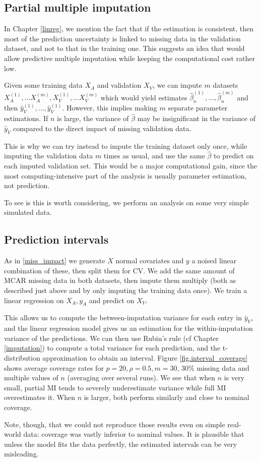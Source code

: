 		\subsection{Partial multiple imputation}
		In Chapter \ref{linreg}, we mention the fact that if the estimation is consistent, then most of the prediction uncertainty is linked to missing data in the validation dataset, and not to that in the training one. This suggests an idea that would allow predictive multiple imputation while keeping the computational cost rather low.
		
		 Given some training data $X_A$ and validation $X_V$, we can impute $m$ datasets $X_A^{(1)}, \ldots X_A^{(m)}, X_V^{(1)}, \ldots X_V^{(m)}$ which would yield estimates $\hat{\beta}_n^{(1)}, \ldots, \hat{\beta}_n^{(m)}$ and then $\hat{y}_V^{(1)}, \ldots, \hat{y}_V^{(1)}$. However, this implies making $m$ separate parameter estimations. If $n$ is large, the variance of $\hat{\beta}$ may be insignificant in the variance of $\hat{y}_V$ compared to the direct impact of missing validation data. 
		 
		 This is why we can try instead to impute the training dataset only once, while imputing the validation data $m$ times as usual, and use the same $\hat{\beta}$ to predict on each imputed validation set. This would be a major computational gain, since the most computing-intensive part of the analysis is usually parameter estimation, not prediction.

To see is this is worth considering, we perform an analysis on some very simple simulated data.

		\subsection{Prediction intervals}
As in \ref{miss_impact} we generate $X$ normal covariates and $y$ a noised linear combination of these, then split them for CV. We add the same amount of MCAR missing data in both datasets, then impute them multiply (both as described just above and by only imputing the training data once). We train a linear regression on $X_A, y_A$ and predict on $X_V$.

This allows us to compute the between-imputation variance for each entry in $\hat{y}_V$, and the linear regression model gives us an estimation for the within-imputation variance of the predictions. We can then use Rubin's rule (cf Chapter \ref{imputation}) to compute a total variance for each prediction, and the t-distribution approximation to obtain an interval. 
Figure \ref{fig.interval_coverage} shows average coverage rates for $p=20, \rho=0.5, m=30$, $30$\% missing data and multiple values of $n$ (averaging over several runs). We see that when $n$ is very small, partial MI tends to severely underestimate variance while full MI overestimates it. When $n$ is larger, both perform similarly and close to nominal coverage. 

Note, though, that we could not reproduce those results even on simple real-world data: coverage was vastly inferior to nominal values. It is plausible that unless the model fits the data perfectly, the estimated intervals can be very misleading. 


